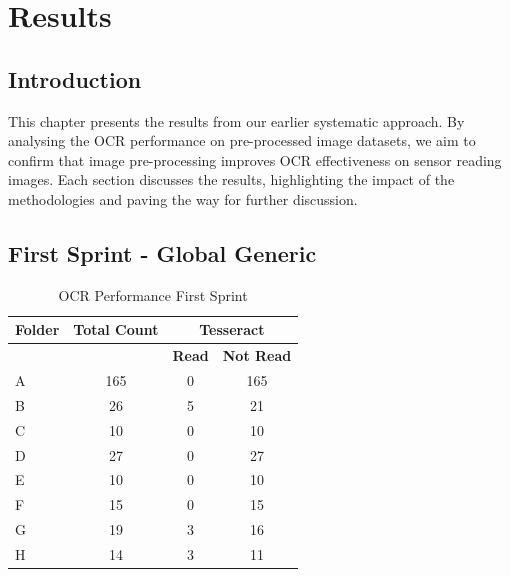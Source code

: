 \chapter{Results}
\label{chap:results}

\section{Introduction}

This chapter presents the results from our earlier systematic approach. By analysing the OCR performance on pre-processed image datasets, we aim to confirm that image pre-processing improves OCR effectiveness on sensor reading images. Each section discusses the results, highlighting the impact of the methodologies and paving the way for further discussion.

\newpage
\section{First Sprint - Global Generic}

\begin{table}[h]
    \centering
    \caption{OCR Performance First Sprint}
    \label{tab:first_sprint_results}
    \begin{tabular}{|l|c|c|c|}
        \hline
        \textbf{Folder} & \textbf{Total Count} & \multicolumn{2}{c|}{\textbf{Tesseract}}                     \\
        \hline
                        &                      & \textbf{Read}                           & \textbf{Not Read} \\
        \hline
        A               & 165                  & 0                                       & 165               \\
        B               & 26                   & 5                                       & 21                \\
        C               & 10                   & 0                                       & 10                \\
        D               & 27                   & 0                                       & 27                \\
        E               & 10                   & 0                                       & 10                \\
        F               & 15                   & 0                                       & 15                \\
        G               & 19                   & 3                                       & 16                \\
        H               & 14                   & 3                                       & 11                \\
        \hline
    \end{tabular}
\end{table}

